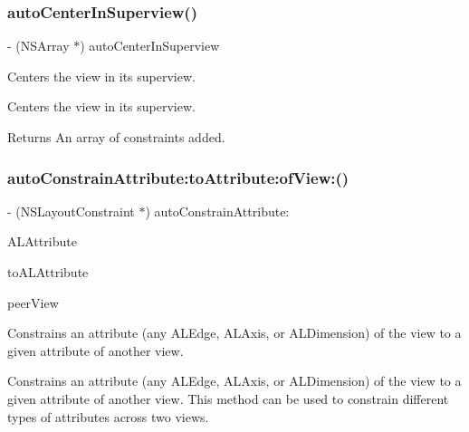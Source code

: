 \subsubsection{\texorpdfstring{auto\+Center\+In\+Superview()}{autoCenterInSuperview()}}
{\footnotesize\ttfamily -\/ (N\+S\+Array $\ast$) auto\+Center\+In\+Superview \begin{DoxyParamCaption}{ }\end{DoxyParamCaption}}

Centers the view in its superview.

Centers the view in its superview.

\begin{DoxyReturn}{Returns}
An array of constraints added. 
\end{DoxyReturn}
\mbox{\label{category_u_i_view_07_auto_layout_08_abee5e0d9288ccd4bd6ee0a7d3638f71f}} 
\subsubsection{\texorpdfstring{auto\+Constrain\+Attribute\+:to\+Attribute\+:of\+View\+:()}{autoConstrainAttribute:toAttribute:ofView:()}}
{\footnotesize\ttfamily -\/ (N\+S\+Layout\+Constraint $\ast$) auto\+Constrain\+Attribute\+: \begin{DoxyParamCaption}\item[{(N\+S\+Integer)}]{A\+L\+Attribute }\item[{toAttribute:(N\+S\+Integer)}]{to\+A\+L\+Attribute }\item[{ofView:(U\+I\+View $\ast$)}]{peer\+View }\end{DoxyParamCaption}}

Constrains an attribute (any A\+L\+Edge, A\+L\+Axis, or A\+L\+Dimension) of the view to a given attribute of another view.

Constrains an attribute (any A\+L\+Edge, A\+L\+Axis, or A\+L\+Dimension) of the view to a given attribute of another view. This method can be used to constrain different types of attributes across two views.


